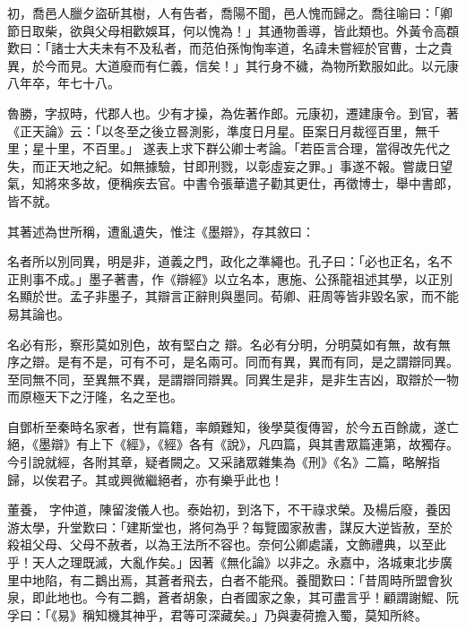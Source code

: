 \begin{pinyinscope}
 初，喬邑人臘夕盜斫其樹，人有告者，喬陽不聞，邑人愧而歸之。喬往喻曰：「卿節日取柴，欲與父母相歡娛耳，何以愧為！」其通物善導，皆此類也。外黃令高頵歎曰：「諸士大夫未有不及私者，而范伯孫恂恂率道，名諱未嘗經於官曹，士之貴異，於今而見。大道廢而有仁義，信矣！」其行身不穢，為物所歎服如此。以元康八年卒，年七十八。



 魯勝，字叔時，代郡人也。少有才操，為佐著作郎。元康初，遷建康令。到官，著《正天論》云：「以冬至之後立晷測影，準度日月星。臣案日月裁徑百里，無千里；星十里，不百里。」
 遂表上求下群公卿士考論。「若臣言合理，當得改先代之失，而正天地之紀。如無據驗，甘即刑戮，以彰虛妄之罪。」事遂不報。嘗歲日望氣，知將來多故，便稱疾去官。中書令張華遣子勸其更仕，再徵博士，舉中書郎，皆不就。



 其著述為世所稱，遭亂遺失，惟注《墨辯》，存其敘曰：



 名者所以別同異，明是非，道義之門，政化之準繩也。孔子曰：「必也正名，名不正則事不成。」墨子著書，作《辯經》以立名本，惠施、公孫龍祖述其學，以正別名顯於世。孟子非墨子，其辯言正辭則與墨同。荀卿、莊周等皆非毀名家，而不能易其論也。



 名必有形，察形莫如別色，故有堅白之
 辯。名必有分明，分明莫如有無，故有無序之辯。是有不是，可有不可，是名兩可。同而有異，異而有同，是之謂辯同異。至同無不同，至異無不異，是謂辯同辯異。同異生是非，是非生吉凶，取辯於一物而原極天下之汙隆，名之至也。



 自鄧析至秦時名家者，世有篇籍，率頗難知，後學莫復傳習，於今五百餘歲，遂亡絕，《墨辯》有上下《經》，《經》各有《說》，凡四篇，與其書眾篇連第，故獨存。今引說就經，各附其章，疑者闕之。又采諸眾雜集為《刑》《名》二篇，略解指歸，以俟君子。其或興微繼絕者，亦有樂乎此也！



 董養，
 字仲道，陳留浚儀人也。泰始初，到洛下，不干祿求榮。及楊后廢，養因游太學，升堂歎曰：「建斯堂也，將何為乎？每覽國家赦書，謀反大逆皆赦，至於殺祖父母、父母不赦者，以為王法所不容也。奈何公卿處議，文飾禮典，以至此乎！天人之理既滅，大亂作矣。」因著《無化論》以非之。永嘉中，洛城東北步廣里中地陷，有二鵝出焉，其蒼者飛去，白者不能飛。養聞歎曰：「昔周時所盟會狄泉，即此地也。今有二鵝，蒼者胡象，白者國家之象，其可盡言乎！顧謂謝鯤、阮孚曰：「《易》稱知機其神乎，君等可深藏矣。」乃與妻荷擔入蜀，莫知所終。




\end{pinyinscope}

